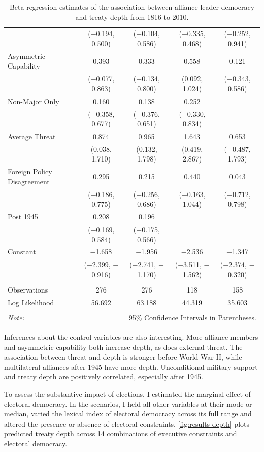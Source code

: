 \documentclass[12pt]{article}
\begin{document}
\begin{table}[!htbp]
{\begin{tabular}{@{\extracolsep{5pt}}lcccc}
  & ($-$0.194, 0.500) & ($-$0.104, 0.586) & ($-$0.335, 0.468) & ($-$0.252, 0.941) \\ 
  Asymmetric Capability & 0.393 & 0.333 & 0.558$^{}$ & 0.121 \\ 
  & ($-$0.077, 0.863) & ($-$0.134, 0.800) & (0.092, 1.024) & ($-$0.343, 0.586) \\ 
  Non-Major Only & 0.160 & 0.138 & 0.252 &  \\ 
  & ($-$0.358, 0.677) & ($-$0.376, 0.651) & ($-$0.330, 0.834) &  \\ 
  Average Threat & 0.874$^{}$ & 0.965$^{}$ & 1.643$^{}$ & 0.653 \\ 
  & (0.038, 1.710) & (0.132, 1.798) & (0.419, 2.867) & ($-$0.487, 1.793) \\ 
  Foreign Policy Disagreement & 0.295 & 0.215 & 0.440 & 0.043 \\ 
  & ($-$0.186, 0.775) & ($-$0.256, 0.686) & ($-$0.163, 1.044) & ($-$0.712, 0.798) \\ 
  Post 1945 & 0.208 & 0.196 &  &  \\ 
  & ($-$0.169, 0.584) & ($-$0.175, 0.566) &  &  \\ 
  Constant & $-$1.658$^{}$ & $-$1.956$^{}$ & $-$2.536$^{}$ & $-$1.347$^{}$ \\ 
  & ($-$2.399, $-$0.916) & ($-$2.741, $-$1.170) & ($-$3.511, $-$1.562) & ($-$2.374, $-$0.320) \\ 
 \hline \\[-1.8ex] 
Observations & 276 & 276 & 118 & 158 \\ 
Log Likelihood & 56.692 & 63.188 & 44.319 & 35.603 \\ 
\hline 
\hline \\[-1.8ex] 
\textit{Note:}  & \multicolumn{4}{r}{95\% Confidence Intervals in Parentheses.} \\ 
\end{tabular} 
}
  \caption{Beta regression estimates of the association between alliance leader democracy and treaty depth from 1816 to 2010.} 
  \label{tab:reg-est} 
\end{table} 


Inferences about the control variables are also interesting.
More alliance members and asymmetric capability both increase depth, as does external threat.
The association between threat and depth is stronger before World War II, while multilateral alliances after 1945 have more depth. 
Unconditional military support and treaty depth are positively correlated, especially after 1945. 


To assess the substantive impact of elections, I estimated the marginal effect of electoral democracy. 
In the scenarios, I held all other variables at their mode or median, varied the lexical index of electoral democracy across its full range and altered the presence or absence of electoral constraints. 
\autoref{fig:results-depth} plots predicted treaty depth across 14 combinations of executive constraints and electoral democracy. 
\end{document}
